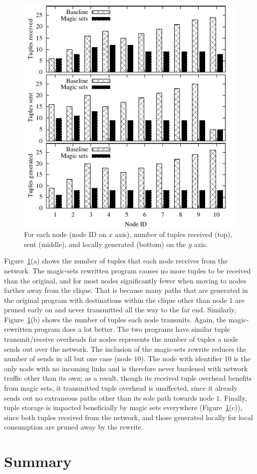 \begin{figure}
\centering
\includegraphics{figures/magicNumbers}
\ssp
\caption{For each node (node ID on $x$ axis), number of tuples received
  (top), sent (middle), and locally generated (bottom) on the $y$ axis.}
\label{ch:evita:fig:magicresults}
\end{figure}

Figure~\ref{ch:evita:fig:magicresults}(a) shows the number of tuples that each
node receives from the network.  The magic-sets rewritten program causes no
more tuples to be received than the original, and for most nodes significantly
fewer when moving to nodes farther away from the clique.  That is because many
paths that are generated in the original program with destinations within the
clique other than node $1$ are pruned early on and never transmitted all the
way to the far end.  Similarly, Figure~\ref{ch:evita:fig:magicresults}(b) shows
the number of tuples each node transmits.  Again, the magic-rewritten program
does a lot better.  The two programs have similar tuple transmit/receive
overheads for nodes represents the number of tuples a node sends out over the
network.  The inclusion of the magic-sets rewrite reduces the number of sends
in all but one case (node $10$).  The node with identifier $10$ is the only
node with no incoming links and is therefore never burdened with network
traffic other than its own; as a result, though its received tuple overhead
benefits from magic sets, it transmitted tuple overhead is unaffected, since it
already sends out no extraneous paths other than its sole path towards node
$1$.  Finally, tuple storage is impacted beneficially by magic sets everywhere
(Figure~\ref{ch:evita:fig:magicresults}(c)), since both  tuples
received from the network, and those generated locally for local consumption
are pruned away by the rewrite.



\section{Summary}
\label{ch:evita:sec:summary}


